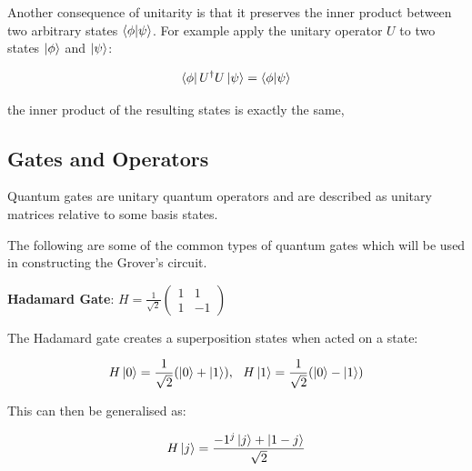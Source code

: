 \documentclass{article}
\begin{document}
\noindent
Another consequence of unitarity is that it preserves the inner product between two arbitrary states $\braket{\phi}{\psi}$. For example apply the unitary operator $U$ to two states $\ket{\phi}$ and $\ket{\psi}$:
\vspace{5mm}

\begin{equation}
\bra{\phi} U^{\dagger} U\ket{\psi} = \braket{\phi}{\psi}
\end{equation}
\vspace{5mm}

\noindent
the inner product of the resulting states is exactly the same,
\vspace{10mm}


\subsection{Gates and Operators}
\vspace{5mm}

Quantum gates are unitary quantum operators and are described as unitary matrices relative to some basis states.
\vspace{5mm}

\noindent
The following are some of the common types of quantum gates\cite{voorhoede_pauli-x_nodate} which will be used in constructing the Grover's circuit.
\vspace{5mm}

\textbf{Hadamard Gate}: \qquad $H = \frac{1}{\sqrt{2}} \begin{pmatrix} 1 & 1 \\ 1 & -1 \end{pmatrix}$
\vspace{5mm}

\noindent
The Hadamard gate creates a superposition states when acted on a state:
\vspace{5mm}


\begin{equation}
H\ket{0} = \frac{1}{\sqrt{2}} (\ket{0} + \ket{1}), \ \ H\ket{1} = \frac{1}{\sqrt{2}}(\ket{0} - \ket{1})   
\end{equation}
\vspace{5mm}

\noindent
This can then be generalised as:
\vspace{5mm}

\begin{equation}
H\ket{j} = \frac{-1^j\ket{j} + \ket{1 - j}}{\sqrt{2}} 
\end{equation}
\vspace{5mm}
\end{document}
